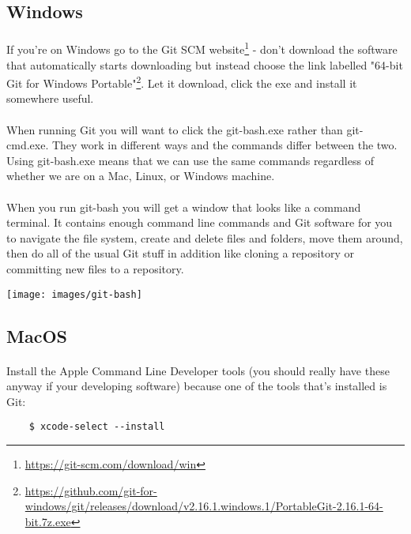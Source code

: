 \documentclass[10pt, a4paper]{article}
\begin{document}
\subsection{Windows}
\paragraph{} If you're on Windows go to the Git SCM website\footnote{\url{https://git-scm.com/download/win}}  - don't download the software that automatically starts downloading but instead choose the link labelled "64-bit Git for Windows Portable"\footnote{\url{https://github.com/git-for-windows/git/releases/download/v2.16.1.windows.1/PortableGit-2.16.1-64-bit.7z.exe}}. Let it download, click the exe and install it somewhere useful.

\paragraph{} When running Git you will want to click the git-bash.exe rather than git-cmd.exe. They work in different ways and the commands differ between the two. Using git-bash.exe means that we can use the same commands regardless of whether we are on a Mac, Linux, or Windows machine.

\paragraph{} When you run git-bash you will get a window that looks like a command terminal. It contains enough command line commands and Git software for you to navigate the file system, create and delete files and folders, move them around, then do all of the usual Git stuff in addition like cloning a repository or committing new files to a repository.

\texttt{[image: images/git-bash]}


\subsection{MacOS}
\paragraph{} Install the Apple Command Line Developer tools (you should really have these anyway if your developing software) because one of the tools that's installed is Git:

\begin{lstlisting}
    $ xcode-select --install 
\end{lstlisting}
\end{document}
